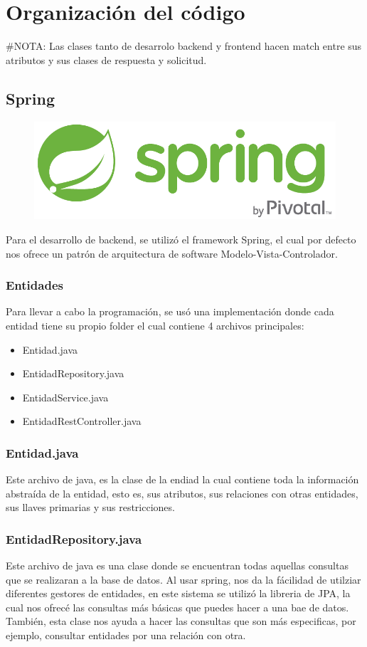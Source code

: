 \chapter{Organización del código}

\#NOTA: Las clases tanto de desarrolo backend y frontend hacen match entre sus atributos y sus clases de respuesta y solicitud.
\section{Spring}

\begin{figure}[H]
    \centering
    \includegraphics[width=0.4\linewidth]{images/tecnologias/spring.png}
\end{figure}

Para el desarrollo de backend, se utilizó el framework Spring, el cual por defecto nos ofrece un patrón de arquitectura de software Modelo-Vista-Controlador.

\subsection{Entidades}
Para llevar a cabo la programación, se usó una implementación donde cada entidad tiene su propio folder el cual contiene 4 archivos principales:

\begin{itemize}
    \item Entidad.java
    \item EntidadRepository.java
    \item EntidadService.java
    \item EntidadRestController.java
\end{itemize}

\subsection{Entidad.java}
Este archivo de java, es la clase de la endiad la cual contiene toda la información abstraída de la entidad, esto es, sus atributos, sus relaciones con otras entidades, sus llaves primarias y sus restricciones.
\subsection{EntidadRepository.java}
Este archivo de java es una clase donde se encuentran todas aquellas consultas que se realizaran a la base de datos.
Al usar spring, nos da la fácilidad de utilziar diferentes gestores de entidades, en este sistema se utilizó la libreria de JPA, la cual nos ofrecé las consultas más básicas que puedes hacer a una bae de datos.
También, esta clase nos ayuda a hacer las consultas que son más especificas, por ejemplo, consultar entidades por una relación con otra.
